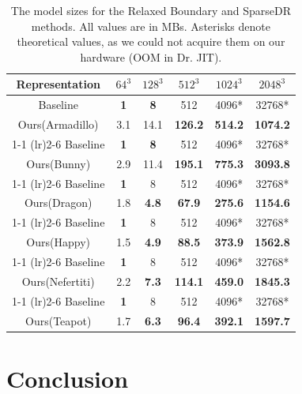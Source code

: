 \documentclass{article}
\begin{document}
\begin{table}
    \centering
    \begin{tabular}{cccccc}
        \toprule
        Representation & $64^3$ & $128^3$ & $512^3$ & $1024^3$ & $2048^3$  \\
        \midrule[\heavyrulewidth]
        Baseline      & \textbf{1} & \textbf{8} & 512  & 4096* & 32768* \\
        Ours(Armadillo) &   3.1 & 14.1 & \textbf{126.2} & \textbf{514.2} & \textbf{1074.2}  \\
        \cmidrule(lr){1-1}  \cmidrule(lr){2-6}
        Baseline      & \textbf{1} & \textbf{8} & 512  & 4096* & 32768* \\
        Ours(Bunny) &   2.9 & 11.4 & \textbf{195.1} & \textbf{775.3} & \textbf{3093.8}  \\
        \cmidrule(lr){1-1}  \cmidrule(lr){2-6}
        Baseline      & \textbf{1} & 8   & 512  & 4096* & 32768* \\
        Ours(Dragon) &   1.8 & \textbf{4.8} & \textbf{67.9} & \textbf{275.6} & \textbf{1154.6}  \\
        \cmidrule(lr){1-1}  \cmidrule(lr){2-6}
        Baseline      & \textbf{1} & 8   & 512  & 4096* & 32768* \\
        Ours(Happy) &   1.5 & \textbf{4.9} & \textbf{88.5} & \textbf{373.9} & \textbf{1562.8}  \\
        \cmidrule(lr){1-1}  \cmidrule(lr){2-6}
        Baseline      & \textbf{1} & 8   & 512  & 4096* & 32768* \\
        Ours(Nefertiti) &   2.2 & \textbf{7.3} & \textbf{114.1} & \textbf{459.0} & \textbf{1845.3}  \\
        \cmidrule(lr){1-1}  \cmidrule(lr){2-6}
        Baseline      & \textbf{1} & 8   & 512  & 4096* & 32768* \\
        Ours(Teapot) & 1.7 & \textbf{6.3} & \textbf{96.4} & \textbf{392.1} & \textbf{1597.7}  \\
        \bottomrule
    \end{tabular}
    \caption{The model sizes for the Relaxed Boundary and SparseDR methods. All values are in MBs. Asterisks denote theoretical values, as we could not acquire them on our hardware (OOM in Dr. JIT).}
    \label{tab:comp_size}
\end{table}

\section{Conclusion}
\end{document}
